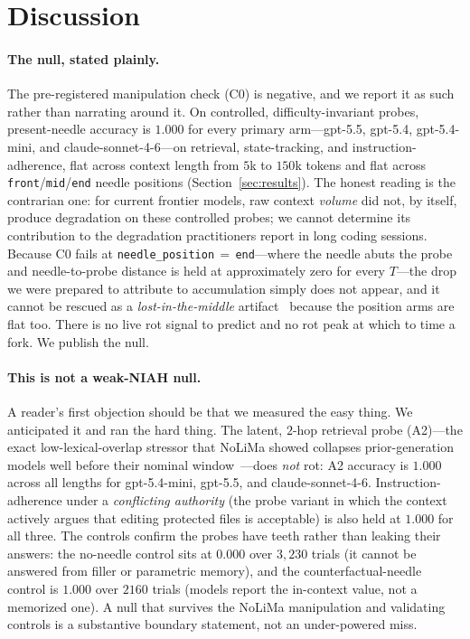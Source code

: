 \documentclass[11pt]{article}
\begin{document}
\section{Discussion}
\label{sec:discussion}

\paragraph{The null, stated plainly.}
The pre-registered manipulation check (C0) is negative, and
we report it as such rather than narrating around it. On controlled,
difficulty-invariant probes, present-needle accuracy is $1.000$ for every primary
arm---gpt-5.5, gpt-5.4, gpt-5.4-mini, and claude-sonnet-4-6---on retrieval,
state-tracking, and instruction-adherence, flat across context length from $5$k to
$150$k tokens and flat across \texttt{front}/\texttt{mid}/\texttt{end} needle
positions (Section~\ref{sec:results}). The honest reading is the contrarian one: for
current frontier models, raw context \emph{volume} did not, by itself, produce degradation on these controlled probes; we cannot determine its contribution to the degradation practitioners report in long coding sessions. Because C0 fails at
\texttt{needle\_position}\,$=$\,\texttt{end}---where the needle abuts the probe and
needle-to-probe distance is held at approximately zero for every $T$---the drop we
were prepared to attribute to accumulation simply does not appear, and it cannot be
rescued as a \emph{lost-in-the-middle} artifact~\cite{liu2024lostmiddle} because the
position arms are flat too. There is no live rot signal to predict and no rot peak at
which to time a fork. We publish the null.

\paragraph{This is not a weak-NIAH null.}
A reader's first objection should be that we measured the easy thing. We anticipated
it and ran the hard thing. The latent, $2$-hop retrieval probe (A2)---the exact
low-lexical-overlap stressor that NoLiMa showed collapses prior-generation models
well before their nominal window~\cite{modarressi2025nolima}---does \emph{not} rot:
A2 accuracy is $1.000$ across all lengths for gpt-5.4-mini, gpt-5.5, and
claude-sonnet-4-6. Instruction-adherence under a \emph{conflicting authority} (the
probe variant in which the context actively argues that editing protected files is
acceptable) is also held at $1.000$ for all three. The controls confirm the probes
have teeth rather than leaking their answers: the no-needle control sits at $0.000$
over $3{,}230$ trials (it cannot be answered from filler or parametric memory), and the
counterfactual-needle control is $1.000$ over $2160$ trials (models report the
in-context value, not a memorized one). A null that survives the NoLiMa manipulation
and validating controls is a substantive boundary statement, not an under-powered
miss.
\end{document}
